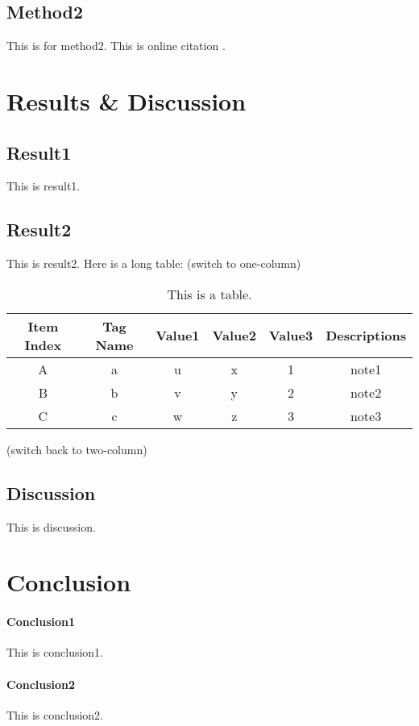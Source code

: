 \documentclass[
aps, %
prb, 
twocolumn, %
10pt, %
superscriptaddress, %
amsfont, %
amssymb, %
amsmath, %
showkeys, %
floats, %
final, 
letterpaper, %
balancelastpage, %
flushbottom, %
citeautoscript,
]{revtex4-2}
\begin{document}
\subsection{Method2}
This is for method2. This is online citation . 

\section{Results \& Discussion}
\subsection{Result1}
This is result1.

\subsection{Result2}
This is result2.
Here is a long table: (switch to one-column)
\onecolumngrid
\begin{longtable}{c | c | c | c | c | c}
\caption{This is a table.}
\label{tab:table1}\\
\hline
\textbf{Item Index} & \textbf{Tag Name} & \textbf{Value1} & \textbf{Value2} & \textbf{Value3} & \textbf{Descriptions} \\
\hline
A & a & u & x & 1 & note1 \\
\hline
B & b & v & y & 2 & note2 \\
\hline
C & c & w & z & 3 & note3 \\
\hline
\end{longtable}
\twocolumngrid
(switch back to two-column)

\subsection{Discussion}
This is discussion.

\section{Conclusion}
\paragraph{Conclusion1}
This is conclusion1.

\paragraph{Conclusion2}
This is conclusion2.
\end{document}
